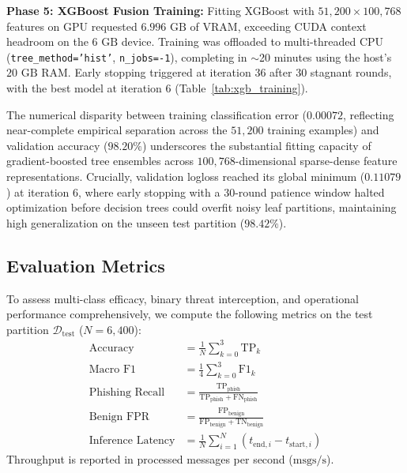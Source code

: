 \documentclass[journal]{IEEEtran}
\begin{document}
\textbf{Phase 5: XGBoost Fusion Training:} Fitting XGBoost with $51{,}200 \times 100{,}768$ features on GPU requested $6.996\text{ GB}$ of VRAM, exceeding CUDA context headroom on the $6\text{ GB}$ device. Training was offloaded to multi-threaded CPU (\texttt{tree\_method='hist'}, \texttt{n\_jobs=-1}), completing in $\sim$20 minutes using the host's $20\text{ GB}$ RAM. Early stopping triggered at iteration 36 after 30 stagnant rounds, with the best model at iteration 6 (Table~\ref{tab:xgb_training}).

\begin{table}[!htbp]
\caption{XGBoost Fusion Classifier Training Progression (100,768-Dimensional Features)}
\label{tab:xgb_training}
\centering
{}
\end{table}

The numerical disparity between training classification error ($0.00072$, reflecting near-complete empirical separation across the $51{,}200$ training examples) and validation accuracy ($98.20\%$) underscores the substantial fitting capacity of gradient-boosted tree ensembles across $100{,}768$-dimensional sparse-dense feature representations. Crucially, validation logloss reached its global minimum ($0.11079$) at iteration 6, where early stopping with a 30-round patience window halted optimization before decision trees could overfit noisy leaf partitions, maintaining high generalization on the unseen test partition ($98.42\%$).

\subsection{Evaluation Metrics}
To assess multi-class efficacy, binary threat interception, and operational performance comprehensively, we compute the following metrics on the test partition $\mathcal{D}_{\text{test}}$ ($N = 6,400$):
\begin{align}
    \text{Accuracy} &= \frac{1}{N} \sum_{k=0}^3 \text{TP}_k \\
    \text{Macro F1} &= \frac{1}{4} \sum_{k=0}^3 \text{F1}_k \\
    \text{Phishing Recall} &= \frac{\text{TP}_{\text{phish}}}{\text{TP}_{\text{phish}} + \text{FN}_{\text{phish}}} \\
    \text{Benign FPR} &= \frac{\text{FP}_{\text{benign}}}{\text{FP}_{\text{benign}} + \text{TN}_{\text{benign}}} \\
    \text{Inference Latency} &= \frac{1}{N} \sum_{i=1}^N (t_{\text{end}, i} - t_{\text{start}, i})
\end{align}
Throughput is reported in processed messages per second ($\text{msgs/s}$).
\end{document}
